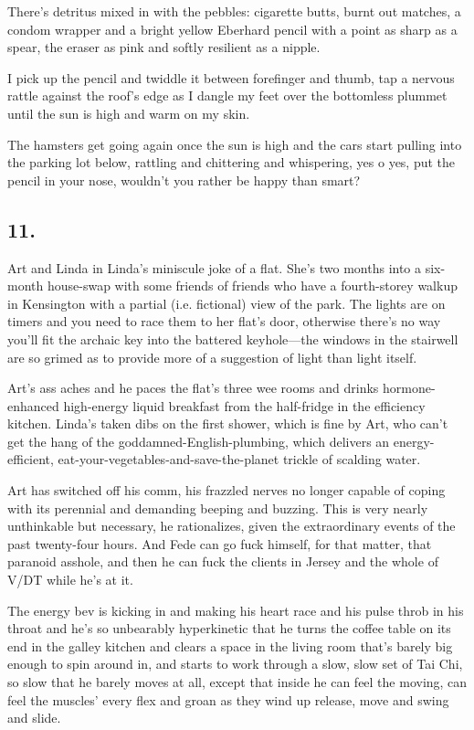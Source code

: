 There’s detritus mixed in with the pebbles: cigarette butts, burnt
out matches, a condom wrapper and a bright yellow Eberhard pencil
with a point as sharp as a spear, the eraser as pink and softly
resilient as a nipple.

I pick up the pencil and twiddle it between forefinger and thumb,
tap a nervous rattle against the roof’s edge as I dangle my feet
over the bottomless plummet until the sun is high and warm on my
skin.

The hamsters get going again once the sun is high and the cars
start pulling into the parking lot below, rattling and chittering
and whispering, yes o yes, put the pencil in your nose, wouldn’t
you rather be happy than smart?

\subsection{11.}

Art and Linda in Linda’s miniscule joke of a flat. She’s two months
into a six-month house-swap with some friends of friends who have a
fourth-storey walkup in Kensington with a partial (i.e. fictional)
view of the park. The lights are on timers and you need to race
them to her flat’s door, otherwise there’s no way you’ll fit the
archaic key into the battered keyhole—the windows in the stairwell
are so grimed as to provide more of a suggestion of light than
light itself.

Art’s ass aches and he paces the flat’s three wee rooms and drinks
hormone-enhanced high-energy liquid breakfast from the half-fridge
in the efficiency kitchen. Linda’s taken dibs on the first shower,
which is fine by Art, who can’t get the hang of the
goddamned-English-plumbing, which delivers an energy-efficient,
eat-your-vegetables-and-save-the-planet trickle of scalding water.

Art has switched off his comm, his frazzled nerves no longer
capable of coping with its perennial and demanding beeping and
buzzing. This is very nearly unthinkable but necessary, he
rationalizes, given the extraordinary events of the past
twenty-four hours. And Fede can go fuck himself, for that matter,
that paranoid asshole, and then he can fuck the clients in Jersey
and the whole of V/DT while he’s at it.

The energy bev is kicking in and making his heart race and his
pulse throb in his throat and he’s so unbearably hyperkinetic that
he turns the coffee table on its end in the galley kitchen and
clears a space in the living room that’s barely big enough to spin
around in, and starts to work through a slow, slow set of Tai Chi,
so slow that he barely moves at all, except that inside he can feel
the moving, can feel the muscles’ every flex and groan as they wind
up release, move and swing and slide.

